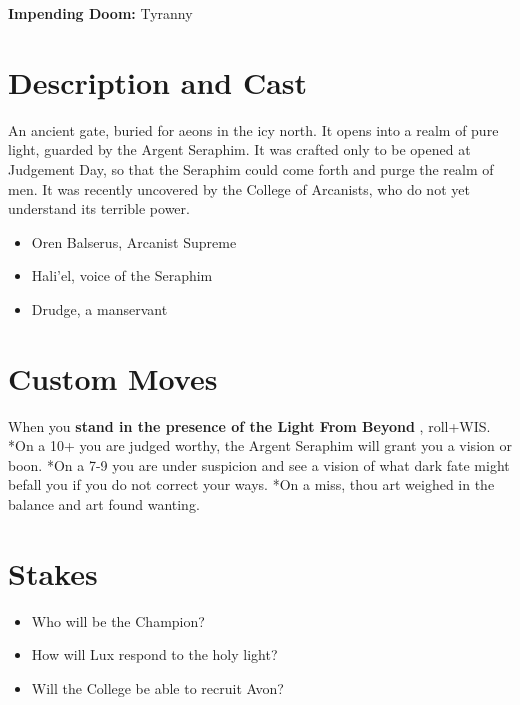  \textbf{Impending Doom:}
 Tyranny
\section{Description and Cast}


 An ancient gate, buried for aeons in the icy north. It opens into a realm of pure light, guarded by the Argent Seraphim. It was crafted only to be opened at Judgement Day, so that the Seraphim could come forth and purge the realm of men. It was recently uncovered by the College of Arcanists, who do not yet understand its terrible power.
\begin{itemize}
\item Oren Balserus, Arcanist Supreme
\item Hali'el, voice of the Seraphim
\item Drudge, a manservant

\end{itemize}
\section{Custom Moves}


 When you \textbf{stand in the presence of the Light From Beyond}
, roll+WIS. *On a 10+ you are judged worthy, the Argent Seraphim will grant you a vision or boon. *On a 7-9 you are under suspicion and see a vision of what dark fate might befall you if you do not correct your ways. *On a miss, thou art weighed in the balance and art found wanting.
\section{Stakes}
\begin{itemize}
\item Who will be the Champion?
\item How will Lux respond to the holy light?
\item Will the College be able to recruit Avon?

\end{itemize}


